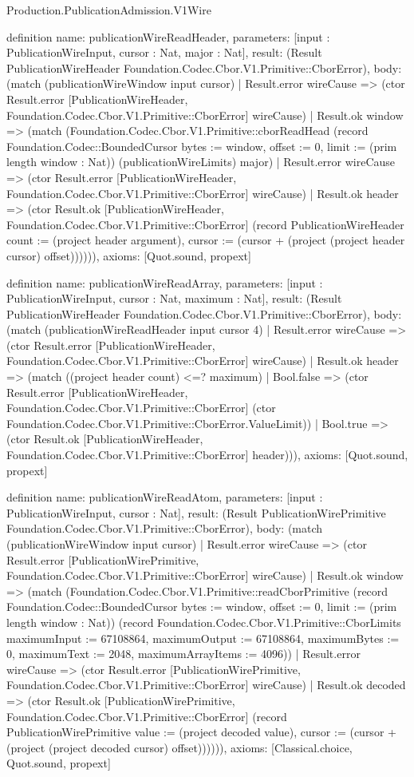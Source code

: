 \begin{lexlean}{Production.PublicationAdmission.V1Wire}
\begin{semanticmodule}
definition{
  name: publicationWireReadHeader,
  parameters: [input : PublicationWireInput, cursor : Nat, major : Nat],
  result: (Result PublicationWireHeader Foundation.Codec.Cbor.V1.Primitive::CborError),
  body: (match (publicationWireWindow input cursor)
    | Result.error wireCause => (ctor Result.error [PublicationWireHeader, Foundation.Codec.Cbor.V1.Primitive::CborError] wireCause)
    | Result.ok window => (match (Foundation.Codec.Cbor.V1.Primitive::cborReadHead (record Foundation.Codec::BoundedCursor {bytes := window, offset := 0, limit := (prim length window : Nat)}) (publicationWireLimits) major)
      | Result.error wireCause => (ctor Result.error [PublicationWireHeader, Foundation.Codec.Cbor.V1.Primitive::CborError] wireCause)
      | Result.ok header => (ctor Result.ok [PublicationWireHeader, Foundation.Codec.Cbor.V1.Primitive::CborError] (record PublicationWireHeader {count := (project header argument), cursor := (cursor + (project (project header cursor) offset))})))),
  axioms: [Quot.sound, propext]
}

definition{
  name: publicationWireReadArray,
  parameters: [input : PublicationWireInput, cursor : Nat, maximum : Nat],
  result: (Result PublicationWireHeader Foundation.Codec.Cbor.V1.Primitive::CborError),
  body: (match (publicationWireReadHeader input cursor 4)
    | Result.error wireCause => (ctor Result.error [PublicationWireHeader, Foundation.Codec.Cbor.V1.Primitive::CborError] wireCause)
    | Result.ok header => (match ((project header count) <=? maximum)
      | Bool.false => (ctor Result.error [PublicationWireHeader, Foundation.Codec.Cbor.V1.Primitive::CborError] (ctor Foundation.Codec.Cbor.V1.Primitive::CborError.ValueLimit))
      | Bool.true => (ctor Result.ok [PublicationWireHeader, Foundation.Codec.Cbor.V1.Primitive::CborError] header))),
  axioms: [Quot.sound, propext]
}

definition{
  name: publicationWireReadAtom,
  parameters: [input : PublicationWireInput, cursor : Nat],
  result: (Result PublicationWirePrimitive Foundation.Codec.Cbor.V1.Primitive::CborError),
  body: (match (publicationWireWindow input cursor)
    | Result.error wireCause => (ctor Result.error [PublicationWirePrimitive, Foundation.Codec.Cbor.V1.Primitive::CborError] wireCause)
    | Result.ok window => (match (Foundation.Codec.Cbor.V1.Primitive::readCborPrimitive (record Foundation.Codec::BoundedCursor {bytes := window, offset := 0, limit := (prim length window : Nat)}) (record Foundation.Codec.Cbor.V1.Primitive::CborLimits {maximumInput := 67108864, maximumOutput := 67108864, maximumBytes := 0, maximumText := 2048, maximumArrayItems := 4096}))
      | Result.error wireCause => (ctor Result.error [PublicationWirePrimitive, Foundation.Codec.Cbor.V1.Primitive::CborError] wireCause)
      | Result.ok decoded => (ctor Result.ok [PublicationWirePrimitive, Foundation.Codec.Cbor.V1.Primitive::CborError] (record PublicationWirePrimitive {value := (project decoded value), cursor := (cursor + (project (project decoded cursor) offset))})))),
  axioms: [Classical.choice, Quot.sound, propext]
}


\end{semanticmodule}
\end{lexlean}
